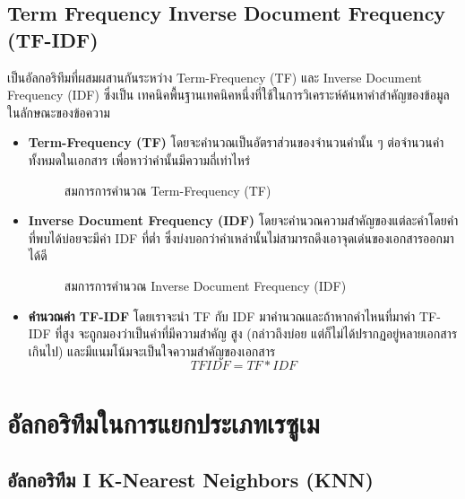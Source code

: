 \subsection{Term Frequency Inverse Document Frequency (TF-IDF)}
เป็นอัลกอริทึมที่ผสมผสานกันระหว่าง Term-Frequency (TF) และ Inverse Document Frequency (IDF) ซึ่งเป็น
เทคนิคพื้นฐานเทคนิคหนึ่งที่ใช้ในการวิเคราะห์ค้นหาคำสำคัญของข้อมูลในลักษณะของข้อความ
\begin{itemize}
    \item \textbf{Term-Frequency (TF)} โดยจะคำนวณเป็นอัตราส่วนของจำนวนคำนั้น ๆ ต่อจำนวนคำทั้งหมดในเอกสาร
    เพื่อหาว่าคำนั้นมีความถี่เท่าไหร่
    \begin{figure}[!h]\centering
        \setlength{\fboxrule}{0.2mm} %
        \setlength{\fboxsep}{1cm}
        \caption{สมการการคำนวณ Term-Frequency (TF)}\label{fig:model4}
    \end{figure}
    \item \textbf{Inverse Document Frequency (IDF)} โดยจะคำนวณความสำคัญของแต่ละคำโดยคำที่พบได้บ่อยจะมีค่า IDF ที่ต่ำ
    ซึ่งบ่งบอกว่าคำเหล่านั้นไม่สามารถดึงเอาจุดเด่นของเอกสารออกมาได้ดี
    \begin{figure}[!h]\centering
        \setlength{\fboxrule}{0.2mm} %
        \setlength{\fboxsep}{1cm}
        \caption{สมการการคำนวณ Inverse Document Frequency (IDF)}\label{fig:model5}
    \end{figure}
    \item \textbf{คำนวณค่า TF-IDF} โดยเราจะนำ TF กับ IDF มาคำนวณและถ้าหากคำไหนที่มาค่า TF-IDF ที่สูง จะถูกมองว่าเป็นคำที่มีความสำคัญ
    สูง (กล่าวถึงบ่อย แต่ก็ไม่ได้ปรากฏอยู่หลายเอกสารเกินไป) และมีแนมโน้มจะเป็นใจความสำคัญของเอกสาร
    \[TFIDF = TF * IDF\]
\end{itemize}


\section{อัลกอริทึมในการแยกประเภทเรซูเม}
\subsection{อัลกอริทึม I K-Nearest Neighbors (KNN)}

